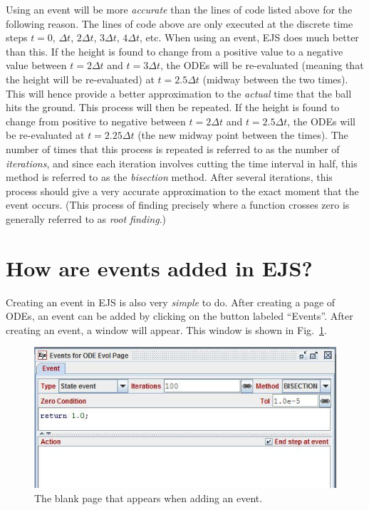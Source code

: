 Using an event will be more \emph{accurate} than the lines of code listed above for the following reason.  The lines of code above are only executed at the discrete time steps $t=0$, $\Delta t$, $2\Delta t$, $3\Delta t$, $4\Delta t$, etc.  When using an event, EJS does much better than this.  If the height is found to change from a positive value to a negative value between $t=2\Delta t$ and $t=3\Delta t$, the ODEs will be re-evaluated (meaning that the height will be re-evaluated) at $t=2.5\Delta t$ (midway between the two times).  This will hence provide a better approximation to the \emph{actual} time that the ball hits the ground.  This process will then be repeated.  If the height is found to change from positive to negative between $t=2\Delta t$ and $t=2.5\Delta t$, the ODEs will be re-evaluated at $t=2.25\Delta t$ (the new midway point between the times). The number of times that this process is repeated is referred to as the number of \emph{iterations}, and since each iteration involves cutting the time interval in half, this method is referred to as the \emph{bisection} method.  After several iterations, this process should give a very accurate approximation to the exact moment that the event occurs.  (This process of finding precisely where a function crosses zero is generally referred to as \emph{root finding}.)

\section{How are events added in EJS?}

Creating an event in EJS is also very \emph{simple} to do. After creating a page of ODEs, an event can be added by clicking on the button labeled ``Events''.  After creating an event, a window will appear. This window is shown in Fig.~\ref{fig:appendixA/Events}.


\begin{figure}[htb]
  \centering
  \includegraphics[scale=\scale]{appendixA/images/events_image.png}
  \caption{The blank page that appears when adding an event.}
  \label{fig:appendixA/Events}
\end{figure}

